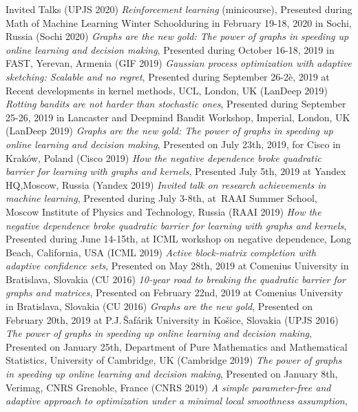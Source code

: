 \documentclass{resume}
\begin{document}
\begin{category}{Invited Talks}
({\sf UPJS  2020})
\citembullet
\emph{Reinforcement learning} (minicourse),
Presented during Math of Machine Learning Winter Schoolduring in February 19-18, 2020 in Sochi, Russia 
({\sf Sochi  2020})
\citembullet
\emph{Graphs are the new gold: The power of graphs in speeding up online learning and decision making},
Presented during October 16-18, 2019 in FAST, Yerevan, Armenia 
({\sf GIF  2019})
\citembullet
\emph{Gaussian process optimization with adaptive sketching: Scalable and no regret},
Presented during September 26-2è, 2019 at Recent developments in kernel methods, UCL, London, UK
({\sf LanDeep 2019})
\citembullet
\emph{Rotting bandits are not harder than stochastic ones},
Presented during September 25-26, 2019 in Lancaster and Deepmind Bandit Workshop, Imperial, London, UK
({\sf LanDeep 2019})
\citembullet
\emph{Graphs are the new gold: The power of graphs in speeding up online learning and decision making},
Presented on July 23th, 2019, for Cisco in Krak\'ow, Poland
({\sf Cisco  2019})
\citembullet
\emph{How the negative dependence broke quadratic barrier for learning with graphs and kernels},
Presented July 5th, 2019 at Yandex HQ,Moscow, Russia
({\sf Yandex  2019})
\citembullet
\emph{Invited talk on research achievements in machine learning},
Presented during July 3-8th, at~RAAI Summer School, Moscow Institute of Physics and Technology, Russia
({\sf RAAI  2019})
\citembullet
\emph{How the negative dependence broke quadratic barrier for learning with graphs and kernels},
Presented during June 14-15th, at ICML workshop on negative dependence, Long Beach, California, USA 
({\sf ICML  2019})
\citembullet
\emph{Active block-matrix completion with adaptive confidence sets}, Presented on May 28th, 2019 at Comenius University in Bratislava, Slovakia 
({\sf CU 2016})
\citembullet
\emph{10-year road to breaking the quadratic barrier for graphs and matrices}, Presented on February 22nd, 2019 at Comenius University in Bratislava, Slovakia 
({\sf CU 2016})
\citembullet
\emph{Graphs are the new gold}, Presented on February 20th, 2019 at P.J.\,\v{S}af\'arik University in Ko\v{s}ice, Slovakia
({\sf UPJS 2016})
\citembullet
\emph{The power of graphs in speeding up online learning and decision making},
Presented on January 25th, Department of Pure Mathematics and Mathematical Statistics, University of Cambridge, UK
({\sf Cambridge  2019})
\citembullet
\emph{The power of graphs in speeding up online learning and decision making},
Presented on January 8th, Verimag, CNRS Grenoble, France
({\sf CNRS  2019})
\citembullet
\emph{A simple parameter-free and adaptive approach to optimization under a minimal local smoothness assumption},

\end{category}
\end{document}
